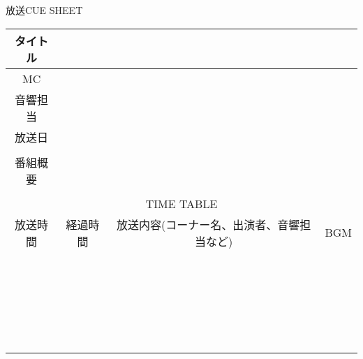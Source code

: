 \documentclass{jsarticle}
\begin{document}
\begin{center}
      {\huge 放送CUE SHEET}
  \begin{longtable}[h]{|c|c|c|c|} \hline
    タイトル&\multicolumn{3}{l|}{\hspace*{150mm}}\rule[-2mm]{0mm}{7mm}\\ \hline
    MC&\multicolumn{3}{l|}{}\rule[-2mm]{0mm}{7mm}\\ \hline
    音響担当&\multicolumn{3}{l|}{}\rule[-2mm]{0mm}{7mm}\\ \hline
    放送日&\multicolumn{3}{l|}{}\rule[-2mm]{0mm}{7mm}\\ \hline
    &\multicolumn{3}{l|}{}\rule[-2mm]{0mm}{7mm}\\ \cline{2-4}
    番組概要&\multicolumn{3}{l|}{}\rule[-2mm]{0mm}{7mm}\\ \cline{2-4}
    &\multicolumn{3}{l|}{}\rule[-2mm]{0mm}{7mm}\\ \hline \hline
    \multicolumn{4}{|c|}{TIME TABLE}\rule[-2mm]{0mm}{7mm}\\ \hline
    放送時間&経過時間&\hspace*{20truemm}放送内容(コーナー名、出演者、音響担当など)\hspace*{20truemm}&\hspace*{10truemm}BGM\hspace*{10truemm}\\ \hline
    &&&\\
    &&&\\
    &&&\\
    &&&\\
    &&&\\
    &&&\\
    &&&\\
    &&&\\
    &&&\\
    &&&\\
    &&&\\
    &&&\\
    &&&\\
    &&&\\
    &&&\\
    &&&\\
    &&&\\
    &&&\\
    &&&\\
    &&&\\
    &&&\\
    &&&\\
    &&&\\
    &&&\\

\end{longtable}
\end{center}
\end{document}
